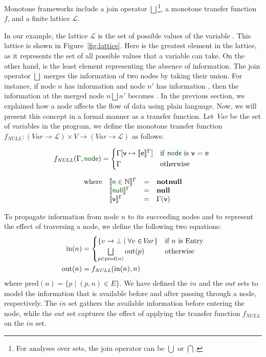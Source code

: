 Monotone frameworks include a join operator $\bigsqcup$\footnote{
  For analyses over sets, the join operator can be $\bigcup$ or $\bigcap$.
}, a monotone transfer function $f$,
and a finite lattice $\mathcal{L}$.

In our example, the lattice $\mathcal{L}$ is the set of possible values of the variable .
This lattice is shown in Figure~\ref{fig:lattice}. Here  is
the greatest element in the lattice, as it represents the set of all possible values
that a variable can take. On the other hand,  is the least element
representing the absence of information.
The join operator $\bigsqcup$ merges the information of two nodes by taking their
union. For instance, if node $n$ has information  and node $n'$ has
information , then the information at the merged node $n \bigsqcup n'$
becomes .
In the previous section, we explained how a node affects the flow of data
using plain language. Now, we will present this concept in a formal manner
as a transfer function. Let \textit{Var} be the set of variables in the program, we define
the monotone transfer function $f_{\textit{NULL}}: (\textit{Var} \rightarrow \mathcal{L}) \times V \rightarrow (\textit{Var} \rightarrow \mathcal{L})$
as follows:

\[
  f_{\textit{NULL}}(\Gamma, \vterminal{node}) =
  \begin{cases*}
  \Gamma[\vmetavar{v} \mapsto \semNPA{\vmetavar{e}}^\Gamma] & if  \vterminal{node} is \vterminal{\vmetavar{v} = \vmetavar{e}}  \\
  \Gamma  & otherwise
\end{cases*} \]%

\[
\begin{array}{llcl}
\textrm{where}&\semNPA{\vterminal{n}\in \mathbb{N}}^\Gamma			&=& \textbf{notnull}\\
&\semNPA{\vterminal{null}}^\Gamma			&=& \textbf{null}\\
&\semNPA{\vmetavar{v}}^\Gamma				&=& \Gamma(\vmetavar{v})\\
\end{array}
\]


To propagate information from node $n$ to its succeeding nodes and to represent the
effect of traversing a node, we define the following two equations:
\begin{align*}
  \text{in}(n) &= \begin{cases} \{ v \rightarrow \bot \mid \forall v \in $\textit{Var}$ \} & $if $ n $ is Entry$ \\ \bigsqcup\limits_{p \in \text{pred}(n)} \text{out}(p) & $otherwise$ \end{cases} \\
  \text{out}(n) &= f_{\mathit{NULL}}(\text{in}(n),n)
\end{align*}
where $\text{pred}(n) = \{ p \mid (p,n)\in E\}$.
We have defined the $in$ and the $out$ sets to model the information that is available
before and after passing through a node, respectively. The $in$ set gathers the available
information before entering the node, while the $out$ set captures the effect
of applying the transfer function $f_{\textit{NULL}}$ on the $in$ set.

